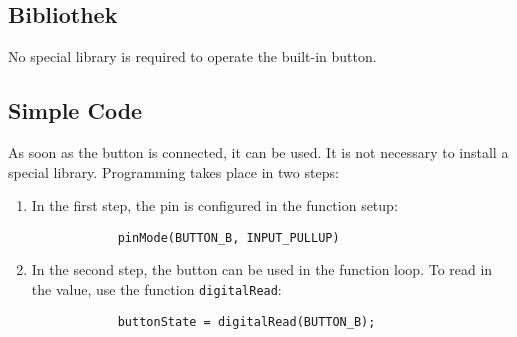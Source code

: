 	\subsection{Bibliothek}
	No special library is required to operate the built-in button.
	
	\subsection{Simple Code}
	As soon as the button is connected, it can be used. It is not necessary to install a special library. Programming takes place in two steps:
	
	\begin{enumerate}
		\item In the first step, the pin is configured in the function setup:
		\begin{verbatim}
			pinMode(BUTTON_B, INPUT_PULLUP)
		\end{verbatim}
		\item In the second step, the button can be used in the function loop. To read in the value, use the function \texttt{digitalRead}:
		\begin{verbatim}
			buttonState = digitalRead(BUTTON_B);
		\end{verbatim}
	\end{enumerate}
	